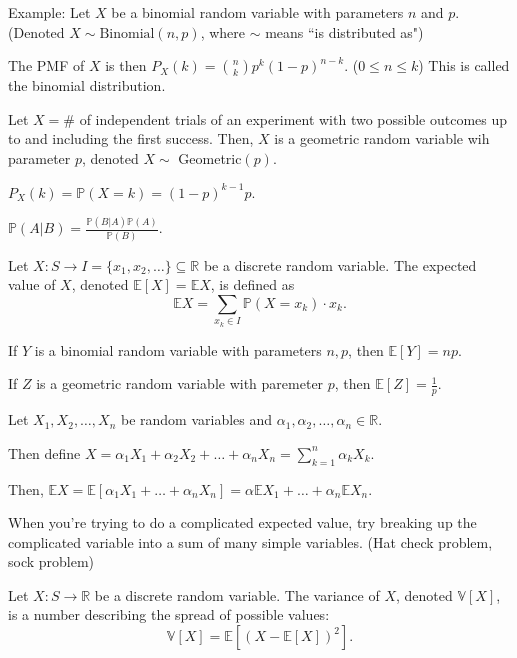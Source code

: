 \documentclass{article}
\begin{document}
    Example: Let $X$ be a binomial random variable with parameters $n$ and $p$. (Denoted $X \sim \text{Binomial}(n,p)$, where $\sim$ means ``is distributed as")
    
    The PMF of $X$ is then $P_X(k) = {n \choose k}p^k(1-p)^{n-k}$. ($0 \leq n \leq k$) This is called the binomial distribution.

\medskip
{}

    Let $X = \#$ of independent trials of an experiment with two possible outcomes up to and including the first success. Then, $X$ is a geometric random variable wih parameter $p$, denoted $X \sim$ Geometric$(p)$.
    
    $P_X(k) = \mathbb P(X = k) = (1 - p)^{k - 1}p$.
    
\medskip
{}

    $\mathbb P(A|B) = \frac{\mathbb P(B|A)\mathbb P(A)}{\mathbb P(B)}$.
    
\medskip
{}

    Let $X:S \to I = \{x_1, x_2, \hdots\} \subseteq \mathbb R$ be a discrete random variable. The expected value of $X$, denoted $\mathbb E[X] = \mathbb EX$, is defined as $$\mathbb EX = \sum_{x_k \in I}\mathbb P(X=x_k)\cdot x_k.$$
    
    If $Y$ is a binomial random variable with parameters $n, p$, then $\mathbb E[Y] = np$.
    
    If $Z$ is a geometric random variable with paremeter $p$, then $\mathbb E[Z] = \frac1p$.
    
\medskip
{}

    Let $X_1, X_2, \hdots, X_n$ be random variables and $\alpha_1, \alpha_2, \hdots, \alpha_n \in \mathbb R$.
    
    Then define $X = \alpha_1X_1 + \alpha_2X_2 + \hdots + \alpha_nX_n = \sum_{k=1}^n\alpha_kX_k$.
    
    Then, $\mathbb EX = \mathbb E[\alpha_1X_1 + \hdots + \alpha_nX_n] = \alpha\mathbb EX_1 + \hdots + \alpha_n \mathbb EX_n$.

\medskip
{}

    When you're trying to do a complicated expected value, try breaking up the complicated variable into a sum of many simple variables. (Hat check problem, sock problem)

\medskip
{}

    Let $X:S \to \mathbb R$ be a discrete random variable. The variance of $X$, denoted $\mathbb V[X]$, is a number describing the spread of possible values: $$\mathbb V[X] = \mathbb E[(X - \mathbb E[X])^2].$$
    
\end{document}
